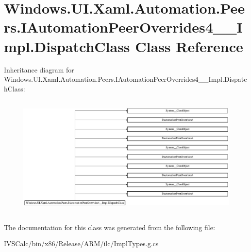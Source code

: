 \hypertarget{class_windows_1_1_u_i_1_1_xaml_1_1_automation_1_1_peers_1_1_i_automation_peer_overrides4_____impl_1_1_dispatch_class}{}\section{Windows.\+U\+I.\+Xaml.\+Automation.\+Peers.\+I\+Automation\+Peer\+Overrides4\+\_\+\+\_\+\+Impl.\+Dispatch\+Class Class Reference}
\label{class_windows_1_1_u_i_1_1_xaml_1_1_automation_1_1_peers_1_1_i_automation_peer_overrides4_____impl_1_1_dispatch_class}
Inheritance diagram for Windows.\+U\+I.\+Xaml.\+Automation.\+Peers.\+I\+Automation\+Peer\+Overrides4\+\_\+\+\_\+\+Impl.\+Dispatch\+Class\+:\begin{figure}[H]
\begin{center}
\leavevmode
\includegraphics[height=6.160000cm]{class_windows_1_1_u_i_1_1_xaml_1_1_automation_1_1_peers_1_1_i_automation_peer_overrides4_____impl_1_1_dispatch_class}
\end{center}
\end{figure}


The documentation for this class was generated from the following file\+:\begin{DoxyCompactItemize}
\item 
I\+V\+S\+Calc/bin/x86/\+Release/\+A\+R\+M/ilc/Impl\+Types.\+g.\+cs\end{DoxyCompactItemize}
